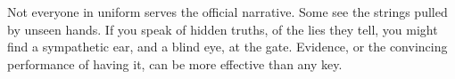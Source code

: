 \documentclass{article}
\begin{document}
\begin{infobox}
Not everyone in uniform serves the official narrative. Some see the strings pulled by unseen hands. If you speak of hidden truths, of the lies they tell, you might find a sympathetic ear, and a blind eye, at the gate. Evidence, or the convincing performance of having it, can be more effective than any key.
\end{infobox}
\end{document}
